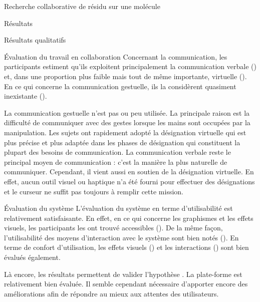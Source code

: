 \documentclass[myfrancais]{mythesis}
\begin{document}
\begin{mychapter}{Recherche collaborative de résidu sur une molécule}
\begin{mysection}{Résultats}
\begin{mysubsection}{Résultats qualitatifs}
\begin{mysubsubsection}{Évaluation du travail en collaboration}
					Concernant la communication, les participants estiment qu'ils exploitent principalement la communication verbale () et, dans une proportion plus faible mais tout de même importante, virtuelle ().
					En ce qui concerne la communication gestuelle, ils la considèrent quasiment inexistante ().

					La communication gestuelle n'est pas ou peu utilisée.
					La principale raison est la difficulté de communiquer avec des gestes lorsque les mains sont occupées par la manipulation.
					Les sujets ont rapidement adopté la désignation virtuelle qui est plus précise et plus adaptée dans les phases de désignation qui constituent la plupart des besoins de communication.
					La communication verbale reste le principal moyen de communication : c'est la manière la plus naturelle de communiquer.
					Cependant, il vient aussi en soutien de la désignation virtuelle.
					En effet, aucun outil visuel ou haptique n'a été fourni pour effectuer des désignations et le curseur ne suffit pas toujours à remplir cette mission.
				\end{mysubsubsection}
				\begin{mysubsubsection}{Évaluation du système}
					L'évaluation du système en terme d'utilisabilité est relativement satisfaisante.
					En effet, en ce qui concerne les graphismes et les effets visuels, les participants les ont trouvé accessibles ().
					De la même façon, l'utilisabilité des moyens d'interaction avec le système sont bien notés ().
					En terme de confort d'utilisation, les effets visuels () et les interactions () sont bien évalués également.

					Là encore, les résultats permettent de valider l'hypothèse .
					La plate-forme est relativement bien évaluée.
					Il semble cependant nécessaire d'apporter encore des améliorations afin de répondre au mieux aux attentes des utilisateurs.


\end{mysubsubsection}
\end{mysubsection}
\end{mysection}
\end{mychapter}
\end{document}

